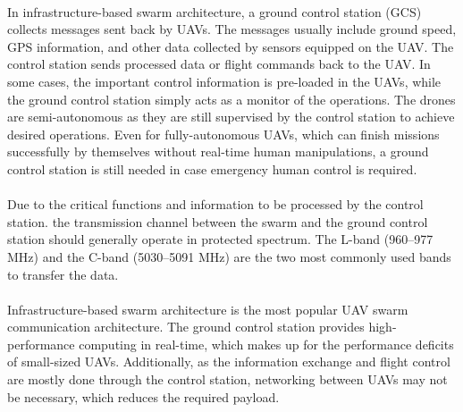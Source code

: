 \documentclass[a4paper,12pt]{report}
\begin{document}
\paragraph{}
In infrastructure-based swarm architecture, a ground control station (GCS) collects messages sent back by UAVs. The messages usually include ground speed, GPS information, and other data collected by sensors equipped on the UAV\cite{doi:10.1139/juvs-2018-0009}. The control station sends processed data or flight commands back to the UAV. In some cases, the important control information is pre-loaded in the UAVs, while the ground control station simply acts as a monitor of the operations. The drones are semi-autonomous as they are still supervised by the control station to achieve desired operations\cite{doi:10.1139/juvs-2018-0009, bekmezci2013flying}. Even for fully-autonomous UAVs, which can finish missions successfully by themselves without real-time human manipulations, a ground control station is still needed in case emergency human control is required\cite{7470933}.

\paragraph{}
Due to the critical functions and information to be processed by the control station. the transmission channel between the swarm and the ground control station should generally operate in protected spectrum. The L-band (960–977 MHz) and the C-band (5030–5091 MHz) are the two most commonly used bands to transfer the data\cite{7470933, bands1, 6712625}. 

\paragraph{}
Infrastructure-based swarm architecture is the most popular UAV swarm communication architecture\cite{bekmezci2013flying}. The ground control station provides high-performance computing in real-time, which makes up for the performance deficits of small-sized UAVs. Additionally, as the information exchange and flight control are mostly done through the control station, networking between UAVs may not be necessary, which reduces the required payload\cite{bekmezci2013flying}.
\end{document}
